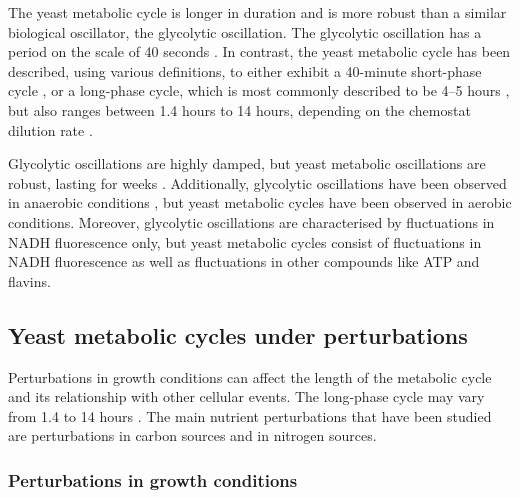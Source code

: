 The yeast metabolic cycle is longer in duration and is more robust than a similar biological oscillator, the glycolytic oscillation.
The glycolytic oscillation has a period on the scale of 40 seconds \parencite{olsenRegulationGlycolyticOscillations2009}.
In contrast, the yeast metabolic cycle has been described, using various definitions, to either exhibit a 40-minute short-phase cycle \parencite{lloydUltradianMetronomeTimekeeper2005, liRapidGenomescaleResponse2006, lloydRedoxRhythmicityClocks2007}, or a long-phase cycle, which is most commonly described to be 4--5 hours \parencite{tuLogicYeastMetabolic2005, tuCyclicChangesMetabolic2007}, but also ranges between 1.4 hours to 14 hours, depending on the chemostat dilution rate \parencite{beuseEffectDilutionRate1998, oneillEukaryoticCellBiology2020}.

Glycolytic oscillations are highly damped, but yeast metabolic oscillations are robust, lasting for weeks \parencite{lloydRedoxRhythmicityClocks2007}.
Additionally, glycolytic oscillations have been observed in anaerobic conditions \parencite{lloydSaccharomycesCerevisiaeOscillatory2019}, but yeast metabolic cycles have been observed in aerobic conditions.
Moreover, glycolytic oscillations are characterised by fluctuations in NADH fluorescence only, but yeast metabolic cycles consist of fluctuations in NADH fluorescence as well as fluctuations in other compounds like ATP and flavins.


\subsection{Yeast metabolic cycles under perturbations}
\label{subsec:intro-ymc-perturbations}

Perturbations in growth conditions can affect the length of the metabolic cycle and its relationship with other cellular events.
The long-phase cycle may vary from 1.4 to 14 hours \parencite{caustonMetabolicRhythmsFramework2018}.
The main nutrient perturbations that have been studied are perturbations in carbon sources and in nitrogen sources.

\subsubsection{Perturbations in growth conditions}
\label{subsubsec:intro-ymc-perturbations-nutrient}


